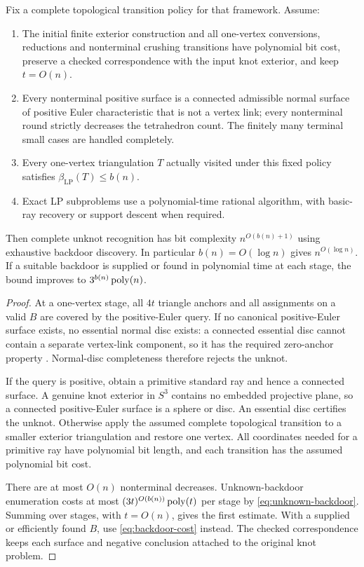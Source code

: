 \begin{theorem}\label{thm:conditional}
Fix a complete topological transition policy for that framework. Assume:
\begin{enumerate}
\item The initial finite exterior construction and all one-vertex conversions, reductions and nonterminal crushing transitions have polynomial bit cost, preserve a checked correspondence with the input knot exterior, and keep $t=O(n)$.
\item Every nonterminal positive surface is a connected admissible normal surface of positive Euler characteristic that is not a vertex link; every nonterminal round strictly decreases the tetrahedron count. The finitely many terminal small cases are handled completely.
\item Every one-vertex triangulation $T$ actually visited under this fixed policy satisfies $\beta_{\mathrm{LP}}(T)\le b(n)$.
\item Exact LP subproblems use a polynomial-time rational algorithm, with basic-ray recovery or support descent when required.
\end{enumerate}
Then complete unknot recognition has bit complexity $n^{O(b(n)+1)}$ using exhaustive backdoor discovery. In particular $b(n)=O(\log n)$ gives $n^{O(\log n)}$. If a suitable backdoor is supplied or found in polynomial time at each stage, the bound improves to $3^{b(n)}\operatorname{poly}(n)$.
\end{theorem}
\begin{proof}
At a one-vertex stage, all $4t$ triangle anchors and all assignments on a valid $B$ are covered by the positive-Euler query. If no canonical positive-Euler surface exists, no essential normal disc exists: a connected essential disc cannot contain a separate vertex-link component, so it has the required zero-anchor property \cite[Lemma~8]{BO}. Normal-disc completeness therefore rejects the unknot.

If the query is positive, obtain a primitive standard ray and hence a connected surface. A genuine knot exterior in $S^3$ contains no embedded projective plane, so a connected positive-Euler surface is a sphere or disc. An essential disc certifies the unknot. Otherwise apply the assumed complete topological transition to a smaller exterior triangulation and restore one vertex. All coordinates needed for a primitive ray have polynomial bit length, and each transition has the assumed polynomial bit cost.

There are at most $O(n)$ nonterminal decreases. Unknown-backdoor enumeration costs at most $(3t)^{O(b(n))}\operatorname{poly}(t)$ per stage by \eqref{eq:unknown-backdoor}. Summing over stages, with $t=O(n)$, gives the first estimate. With a supplied or efficiently found $B$, use \eqref{eq:backdoor-cost} instead. The checked correspondence keeps each surface and negative conclusion attached to the original knot problem.
\end{proof}

